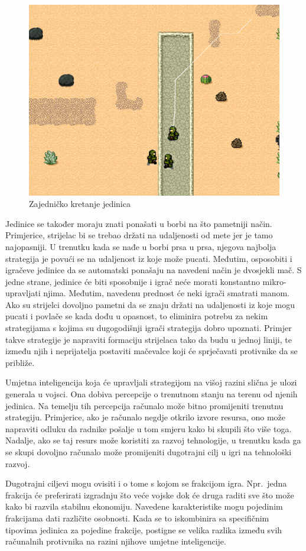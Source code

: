 \documentclass[times, utf8, zavrsni, numeric]{fer}
\begin{document}
\begin{figure}[h] 
	\centering
	\includegraphics[width=0.6\linewidth]{images/RTSgrouping.png}
	\caption{Zajedničko kretanje jedinica}
	\label{fig:RTSgrouping}
\end{figure} 

\par Jedinice se također moraju znati ponašati u borbi na što pametniji način. Primjerice, strijelac bi se trebao držati na udaljenosti od mete jer je tamo najopasniji.
U trenutku kada se nađe u borbi prsa u prsa, njegova najbolja strategija je povući se na udaljenost iz koje može pucati.
Međutim, osposobiti i igračeve jedinice da se automatski ponašaju na navedeni način  je dvosjekli mač.
S jedne strane, jedinice će biti sposobnije i igrač neće morati konstantno mikro-upravljati njima.
Međutim, navedenu prednost će neki igrači smatrati manom.
Ako su strijelci dovoljno pametni da se znaju držati na udaljenosti iz koje mogu pucati i povlače se kada dođu u opasnost, to eliminira potrebu za nekim strategijama s kojima su dugogodišnji igrači strategija dobro upoznati.
Primjer takve strategije je napraviti formaciju strijelaca tako da budu u jednoj liniji, te između njih i neprijatelja postaviti mačevalce koji će sprječavati protivnike da se približe.

\par Umjetna inteligencija koja će upravljali strategijom na višoj razini slična je ulozi generala u vojsci. 
Ona dobiva percepcije o trenutnom stanju na terenu od njenih jedinica.
Na temelju tih percepcija računalo može bitno promijeniti trenutnu strategiju. Primjerice, ako je računalo negdje otkrilo izvore resursa, ono može napraviti odluku da radnike pošalje u tom smjeru kako bi skupili što više toga.
Nadalje, ako se taj resurs može koristiti za razvoj tehnologije, u trenutku kada ga se skupi dovoljno računalo može promijeniti dugotrajni cilj u igri na tehnološki razvoj.

\par Dugotrajni ciljevi mogu ovisiti i o tome s kojom se frakcijom igra. 
Npr.\ jedna frakcija će preferirati izgradnju što veće vojske dok će druga raditi sve što može kako bi razvila stabilnu ekonomiju.
Navedene karakteristike mogu pojedinim frakcijama dati različite osobnosti.
Kada se to iskombinira sa specifičnim tipovima jedinica za pojedine frakcije, postigne se velika razlika između svih računalnih protivnika na razini njihove umjetne inteligencije.
\end{document}
